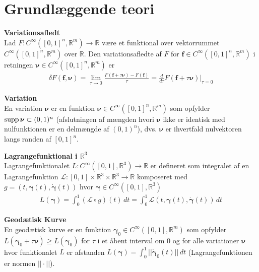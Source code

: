 \section{Grundlæggende teori}
\begin{dfn} {\bf Variationsafledt}\\
Lad $F : C^\infty ([0,1]^n, \mathbb{R}^m) \to \mathbb{R}$ være et funktional over vektorrummet $C^\infty([0,1]^n, \mathbb{R}^m)$ over $\mathbb{R}$. Den variationsafledte af $F$ for $\mathbf{f}\in C^\infty ([0,1]^n, \mathbb{R}^m)$ i retningen ${\boldsymbol \nu}\in C^\infty ([0,1]^n, \mathbb{R}^m)$ er
\begin{align*}
\delta F(\mathbf{f}, {\boldsymbol \nu}) = \lim_{\tau \to 0} \frac{F(\mathbf{f}+\tau{\boldsymbol \nu})-F(\mathbf{f})}{\tau} = \frac{d}{d\tau} F(\mathbf{f}+\tau {\boldsymbol \nu}) \Big|_{\tau = 0}
\end{align*}
\end{dfn}


\begin{dfn} {\bf Variation}\\
En variation ${\boldsymbol \nu}$ er en funktion ${\boldsymbol \nu} \in C^\infty ([0,1]^n, \mathbb{R}^m)$ som opfylder $\textnormal{supp}\, {\boldsymbol \nu} \subset (0,1)^n$ (afslutningen af mængden hvori ${\boldsymbol \nu}$ ikke er identisk med nulfunktionen er en delmængde af $ (0,1)^n$), dvs. ${\boldsymbol \nu}$ er ihvertfald nulvektoren langs randen af $[0,1]^n$.
\end{dfn}


\begin{dfn} {\bf Lagrangefunktional i $\mathbb{R}^3$}\\
Lagrangefunktionalet $L : C^\infty ([0,1], \mathbb{R}^3) \to \mathbb{R}$ er defineret som integralet af en Lagrangefunktion $\mathcal{L} : [0,1] \times \mathbb{R}^3 \times \mathbb{R}^3 \to \mathbb{R}$ komposeret med $g=(t,{\boldsymbol \gamma}(t),\dot{\boldsymbol \gamma}(t))$ hvor ${\boldsymbol \gamma} \in C^\infty ([0,1], \mathbb{R}^3)$
\begin{align*}
L({\boldsymbol \gamma})= \int_0^1 (\mathcal{L}\circ g)(t) \, dt =\int_0^1 \mathcal{L}(t, {\boldsymbol \gamma}(t),\dot{{\boldsymbol \gamma}}(t)) \, dt
\end{align*}
\end{dfn}

\begin{dfn} {\bf Geodætisk Kurve}\\
En geodætisk kurve er en funktion ${\boldsymbol \gamma}_0 \in C^\infty ([0,1],\mathbb{R}^m)$ som opfylder $L({\boldsymbol \gamma}_0+\tau {\boldsymbol \nu}) \geq L({\boldsymbol \gamma}_0)$ for $\tau$ i et åbent interval om $0$ og for alle variationer ${\boldsymbol \nu}$ hvor funktionalet $L$ er afstanden $L({\boldsymbol \gamma})=\int^1_0 ||\dot{\boldsymbol \gamma}_0(t)|| \, dt$ (Lagrangefunktionen er normen $||\cdot||$).
\end{dfn}


